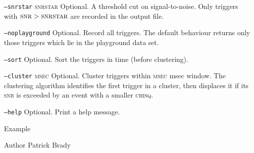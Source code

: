 \begin{entry}
\begin{entry}
\item[\texttt{--snrstar} \textsc{snrstar}] Optional.  A threshold cut
on signal-to-noise.  Only triggers with $\textsc{snr} > \textsc{snrstar}$
are recorded in the output file.

\item[\texttt{--noplayground}] Optional.  Record all triggers.  The
default behaviour returns only those triggers which lie in the
playground data set.  

\item[\texttt{--sort}] Optional.   Sort the triggers in time (before
clustering).  

\item[\texttt{--cluster} \textsc{msec}] Optional.  Cluster triggers
within \textsc{msec} msec window.   The clustering algorithm
identifies the first trigger in a cluster,  then displaces it if its
\textsc{snr} is exceeded by an event with a smaller \textsc{chisq}.

\item[\texttt{--help}] Optional.  Print a help message.
\end{entry}

\item[Example]

\item[Author] 
Patrick Brady
\end{entry}
\clearpage

